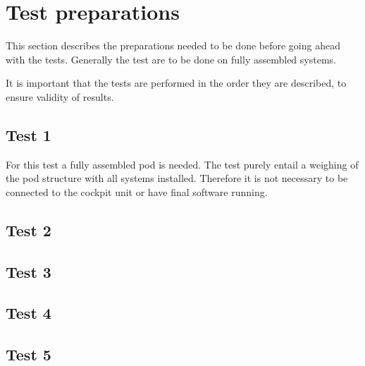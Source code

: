 \documentclass[Main]{subfiles}
\begin{document}
\setcounter{chapter}{2}
\chapter{Test preparations}
This section describes the preparations needed to be done before going ahead with the tests.
Generally the test are to be done on fully assembled systems.

It is important that the tests are performed in the order they are described, to ensure validity of results.

\section{Test 1}
For this test a fully assembled pod is needed. The test purely entail a weighing of the pod structure with all systems installed. Therefore it is not necessary to be connected to the cockpit unit or have final software running.

\section{Test 2}


\section{Test 3}
\section{Test 4}
\section{Test 5}
\end{document}
